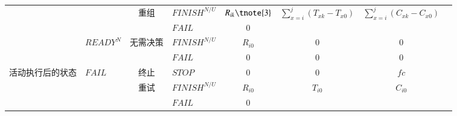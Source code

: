 \begin{table}[htbp]
\begin{threeparttable}
\begin{tabular}{llllllll}
            \multicolumn{1}{c}{} 
            &       
            & \multicolumn{1}{c}{重组} 
            & \multicolumn{1}{l}{$FINISH^{N/U}$} 
            & \multicolumn{1}{c}{$R_{ik}\tnote{3}$} 
            & \multicolumn{1}{c}{\multirow{2}{*}{$\sum\limits_{x = i}^j {({T_{xk}} - {T_{x0}})} $}}
            & \multicolumn{1}{c}{\multirow{2}{*}{$\sum\limits_{x = i}^j {({C_{xk}} - {C_{x0}})} $}} \\
            
            \multicolumn{1}{c}{} 
            &       
            & \multicolumn{1}{c}{} 
            & \multicolumn{1}{l}{$FAIL$} 
            & \multicolumn{1}{c}{0} 
            & \multicolumn{1}{c}{}
            & \multicolumn{1}{c}{} \\
            
            \multicolumn{1}{c}{} 
            & {$READY^N$} 
            & \multicolumn{1}{c}{无需决策} 
            & \multicolumn{1}{l}{$FINISH^{N/U}$} 
            & \multicolumn{1}{c}{$R_{i0}$} 
            & \multicolumn{1}{c}{0} 
            & \multicolumn{1}{c}{0} \\
            
            \multicolumn{1}{c}{} 
            &       
            & \multicolumn{1}{c}{} 
            & \multicolumn{1}{l}{$FAIL$} 
            & \multicolumn{1}{c}{0} 
            & \multicolumn{1}{c}{0} 
            & \multicolumn{1}{c}{0} \\

            \multicolumn{1}{c}{\multirow{11}{*}{\parbox{1em}{活动执行后的状态}}} 
            & {$FAIL$} 
            & \multicolumn{1}{c}{终止} 
            & \multicolumn{1}{l}{$STOP$} 
            & \multicolumn{1}{c}{0} 
            & \multicolumn{1}{c}{0} 
            & \multicolumn{1}{c}{$fc$} \\
            
            \multicolumn{1}{c}{} 
            &       
            & \multicolumn{1}{c}{重试} 
            & \multicolumn{1}{l}{$FINISH^{N/U}$} 
            & \multicolumn{1}{c}{$R_{i0}$} 
            & \multicolumn{1}{c}{\multirow{2}{*}{$T_{i0}$}} 
            & \multicolumn{1}{c}{\multirow{2}{*}{$C_{i0}$}} \\
            
            \multicolumn{1}{c}{} 
            &       
            & \multicolumn{1}{c}{}
            & \multicolumn{1}{l}{$FAIL$} 
            & \multicolumn{1}{c}{0} 
            & \multicolumn{1}{c}{}
            & \multicolumn{1}{c}{} \\
            

\end{tabular}
\end{threeparttable}
\end{table}

